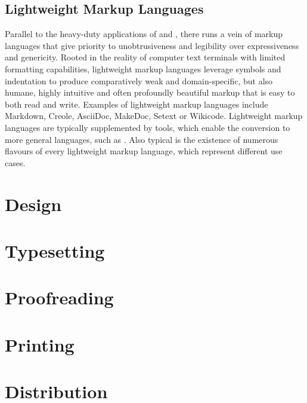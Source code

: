 \documentclass{book}
\begin{document}
      \section{Lightweight Markup Languages}
        Parallel to the heavy-duty applications of  and
        , there runs a vein of markup languages that give priority
        to unobtrusiveness and legibility over expressiveness and genericity.
        Rooted in the reality of computer text terminals with limited formatting
        capabilities, lightweight markup languages leverage symbols and
        indentation to produce comparatively weak and domain-specific, but also
        humane, highly intuitive and often profoundly beautiful markup that is
        easy to both read and write. Examples of lightweight markup languages
        include Markdown, Creole, AsciiDoc, MakeDoc, Setext or Wikicode.
        Lightweight markup languages are typically supplemented by tools, which
        enable the conversion to more general languages, such as .
        Also typical is the existence of numerous flavours of every lightweight
        markup language, which represent different use cases.

    \chapter{Design}
    \chapter{Typesetting}
    \chapter{Proofreading}
    \chapter{Printing}
    \chapter{Distribution}
\end{document}
